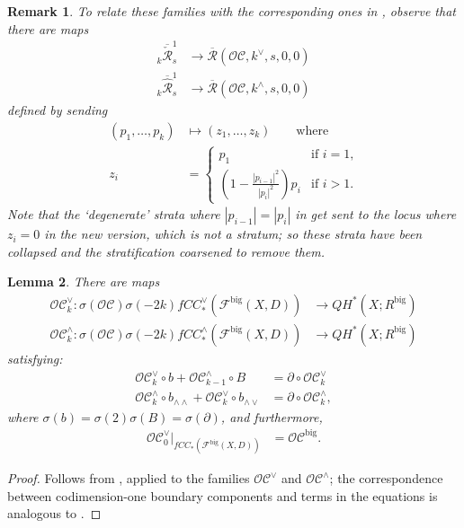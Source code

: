 \documentclass{article}
\newtheorem{lem}{Lemma}[section]
\newtheorem{rem}[lem]{Remark}
\def\fuk{\EuF}
\def\cO{\mathcal{O}}
\def\cC{\mathcal{C}}
\def\cR{\mathcal{R}}
\def\fuk{\mathcal{F}}
\def\Rbar{\overline{\mathcal{R}}}
\def\big{{\operatorname{big}}}
\begin{document}
\begin{rem}
    To relate these families with the corresponding ones in \cite[Section 5.5]{Ganatra:cyclic}, observe that there are maps
    \begin{align*}
        _k \overline{\check{\cR}}^1_s & \to \Rbar({\cO\cC},k^\vee,s,0,0)\\
        _k \overline{\hat{\cR}}^1_s & \to \Rbar({\cO\cC},k^\wedge,s,0,0)
    \end{align*}
    defined by sending
\begin{align*}
    (p_1,\ldots,p_k) &\mapsto (z_1,\ldots,z_k) \qquad \text{where}\\
    z_i & = \begin{cases} p_1& \text{if $i=1$,} \\
    \left( 1-\frac{|p_{i-1}|^2}{|p_i|^2} \right) p_i& \text{if $i>1$.}
    \end{cases}
\end{align*}
Note that the `degenerate' strata where $|p_{i-1}| = |p_i|$ in \cite[Section 5.5]{Ganatra:cyclic} get sent to the locus where $z_i = 0$ in the new version, which is not a stratum; so these strata have been collapsed and the stratification coarsened to remove them. 
\end{rem}

\begin{lem}\label{lem:oc cyc chain}
    There are maps
    \begin{align*}
        \cO\cC^\vee_k: \sigma(\cO\cC)\sigma(-2k)fCC^{\vee}_*(\fuk^\big(X,D)) & \to QH^*(X;R^\big)\\
        \cO\cC^\wedge_k: \sigma(\cO\cC)\sigma(-2k)fCC^{\wedge}_*(\fuk^\big(X,D)) & \to QH^*(X;R^\big)
    \end{align*}
    satisfying:
    \begin{align}
    \label{eq:OC check rel}    \cO\cC^\vee_k \circ b + \cO\cC^\wedge_{k-1} \circ B & = \partial \circ \cO\cC^\vee_k \\
    \label{eq:OC hat rel}    \cO\cC^\wedge_k \circ b_{\wedge\wedge} + \cO\cC^\vee_k \circ b_{\wedge\vee} & = \partial \circ \cO\cC^\wedge_k,
    \end{align}
    where $\sigma(b) = \sigma(2)\sigma(B) = \sigma(\partial)$, and furthermore,
    \begin{align*}
        \cO\cC^\vee_0|_{fCC_*(\fuk^\big(X,D))}&= \cO\cC^\big.
    \end{align*}
\end{lem}
\begin{proof}
    Follows from \cite[Lemma 4.18]{relfukii}, applied to the families $\cO\cC^\vee$ and $\cO\cC^\wedge$; the correspondence between codimension-one boundary components and terms in the equations is analogous to \cite[Proposition 5.17]{Ganatra:cyclic}.
\end{proof}
\end{document}
